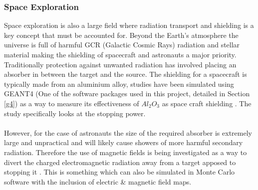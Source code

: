 \documentclass[12pt,a4paper]{article}
\begin{document}
\subsubsection{Space Exploration}
\noindent Space exploration is also a large field where radiation transport and shielding is a key concept that must be accounted for. Beyond the Earth's atmosphere the universe is full of harmful GCR (Galactic Cosmic Rays) radiation and stellar material making the shielding of spacecraft and astronauts a major priority. Traditionally protection against unwanted radiation has involved placing an absorber in between the target and the source. The shielding for a spacecraft is typically made from an aluminium alloy, studies have been simulated using GEANT4 (One of the software packages used in this project, detailed in Section \ref{g4}) as a way to measure its effectiveness of $Al_2O_3$ as space craft shielding \cite{spacesh}. The study specifically looks at the stopping power. 
\\\\
\noindent However, for the case of astronauts the size of the required absorber is extremely large and unpractical and will likely cause showers of more harmful secondary radiation. Therefore the use of magnetic fields is being investigated as a way to divert the charged electromagnetic radiation away from a target apposed to stopping it \cite{magf}. This is something which can also be simulated in Monte Carlo software with the inclusion of electric \& magnetic field maps.
\end{document}
